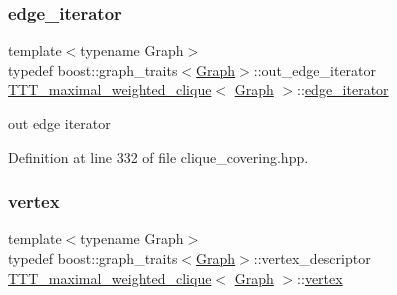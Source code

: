 \mbox{\label{classTTT__maximal__weighted__clique_ae1baef433523ffa0a91eecbee2b2edfc}} 
\subsubsection{\texorpdfstring{edge\+\_\+iterator}{edge\_iterator}}
{\footnotesize\ttfamily template$<$typename Graph$>$ \\
typedef boost\+::graph\+\_\+traits$<$\hyperlink{structGraph}{Graph}$>$\+::out\+\_\+edge\+\_\+iterator \hyperlink{classTTT__maximal__weighted__clique}{T\+T\+T\+\_\+maximal\+\_\+weighted\+\_\+clique}$<$ \hyperlink{structGraph}{Graph} $>$\+::\hyperlink{classTTT__maximal__weighted__clique_ae1baef433523ffa0a91eecbee2b2edfc}{edge\+\_\+iterator}\hspace{0.3cm}{\ttfamily [private]}}



out edge iterator 



Definition at line 332 of file clique\+\_\+covering.\+hpp.

\mbox{\label{classTTT__maximal__weighted__clique_ac6a30ba8fb726c9c83eafe9dc451a799}} 
\subsubsection{\texorpdfstring{vertex}{vertex}}
{\footnotesize\ttfamily template$<$typename Graph$>$ \\
typedef boost\+::graph\+\_\+traits$<$\hyperlink{structGraph}{Graph}$>$\+::vertex\+\_\+descriptor \hyperlink{classTTT__maximal__weighted__clique}{T\+T\+T\+\_\+maximal\+\_\+weighted\+\_\+clique}$<$ \hyperlink{structGraph}{Graph} $>$\+::\hyperlink{classTTT__maximal__weighted__clique_ac6a30ba8fb726c9c83eafe9dc451a799}{vertex}\hspace{0.3cm}{\ttfamily [private]}}



